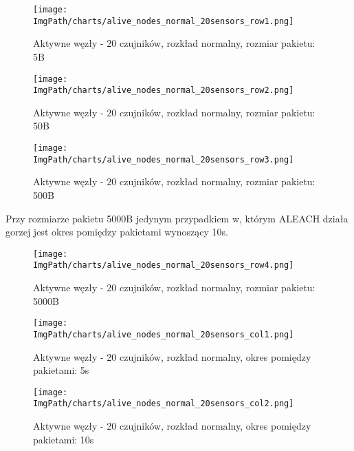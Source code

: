\documentclass[a4paper,12pt,twoside,openany]{report}
\newcommand{\ImgPath}{./img}
\begin{document}
\begin{figure}[H]
	\begin{center}
		\texttt{[image: \\ImgPath/charts/alive\_nodes\_normal\_20sensors\_row1.png]}
	\end{center}
	\caption{Aktywne węzły - 20 czujników, rozkład normalny, rozmiar pakietu: 5B}
\end{figure}

\begin{figure}[H]
	\begin{center}
		\texttt{[image: \\ImgPath/charts/alive\_nodes\_normal\_20sensors\_row2.png]}
	\end{center}
	\caption{Aktywne węzły - 20 czujników, rozkład normalny, rozmiar pakietu: 50B}
\end{figure}

\begin{figure}[H]
	\begin{center}
		\texttt{[image: \\ImgPath/charts/alive\_nodes\_normal\_20sensors\_row3.png]}
	\end{center}
	\caption{Aktywne węzły - 20 czujników, rozkład normalny, rozmiar pakietu: 500B}
\end{figure}

Przy rozmiarze pakietu 5000B jedynym przypadkiem w, którym ALEACH działa gorzej jest okres pomiędzy pakietami wynoszący 10s.

\begin{figure}[H]
	\begin{center}
		\texttt{[image: \\ImgPath/charts/alive\_nodes\_normal\_20sensors\_row4.png]}
	\end{center}
	\caption{Aktywne węzły - 20 czujników, rozkład normalny, rozmiar pakietu: 5000B}
\end{figure}

\begin{figure}[H]
	\begin{center}
		\texttt{[image: \\ImgPath/charts/alive\_nodes\_normal\_20sensors\_col1.png]}
	\end{center}
	\caption{Aktywne węzły - 20 czujników, rozkład normalny, okres pomiędzy pakietami: 5s}
\end{figure}

\begin{figure}[H]
	\begin{center}
		\texttt{[image: \\ImgPath/charts/alive\_nodes\_normal\_20sensors\_col2.png]}
	\end{center}
	\caption{Aktywne węzły - 20 czujników, rozkład normalny, okres pomiędzy pakietami: 10s}
\end{figure}
\end{document}
